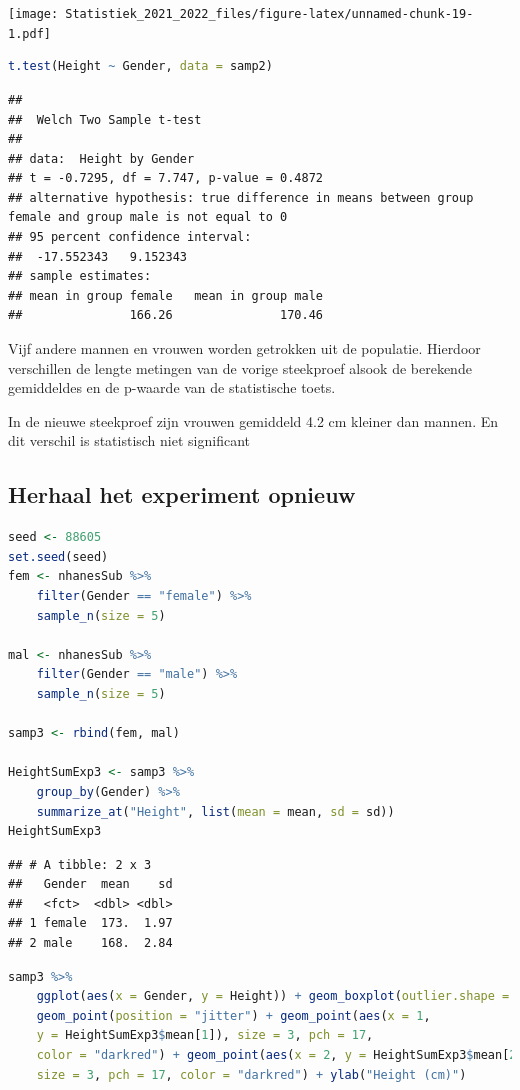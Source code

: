 \documentclass[
  12pt,dutch,coursenotes]{book}
\theoremstyle{definition}
\theoremstyle{definition}
\theoremstyle{definition}
\theoremstyle{definition}
\theoremstyle{remark}
\begin{document}
\texttt{[image: Statistiek\_2021\_2022\_files/figure-latex/unnamed-chunk-19-1.pdf]}

\begin{lstlisting}[language=R]
t.test(Height ~ Gender, data = samp2)
\end{lstlisting}

\begin{lstlisting}
## 
##  Welch Two Sample t-test
## 
## data:  Height by Gender
## t = -0.7295, df = 7.747, p-value = 0.4872
## alternative hypothesis: true difference in means between group female and group male is not equal to 0
## 95 percent confidence interval:
##  -17.552343   9.152343
## sample estimates:
## mean in group female   mean in group male 
##               166.26               170.46
\end{lstlisting}

Vijf andere mannen en vrouwen worden getrokken uit de populatie. Hierdoor verschillen de lengte metingen van de vorige steekproef alsook de berekende gemiddeldes en de p-waarde van de statistische toets.

In de nieuwe steekproef zijn vrouwen gemiddeld 4.2 cm kleiner dan mannen. En dit verschil is statistisch niet significant

\hypertarget{herhaal-het-experiment-opnieuw}{%
\subsection{Herhaal het experiment opnieuw}\label{herhaal-het-experiment-opnieuw}}

\begin{lstlisting}[language=R]
seed <- 88605
set.seed(seed)
fem <- nhanesSub %>%
    filter(Gender == "female") %>%
    sample_n(size = 5)

mal <- nhanesSub %>%
    filter(Gender == "male") %>%
    sample_n(size = 5)

samp3 <- rbind(fem, mal)

HeightSumExp3 <- samp3 %>%
    group_by(Gender) %>%
    summarize_at("Height", list(mean = mean, sd = sd))
HeightSumExp3
\end{lstlisting}

\begin{lstlisting}
## # A tibble: 2 x 3
##   Gender  mean    sd
##   <fct>  <dbl> <dbl>
## 1 female  173.  1.97
## 2 male    168.  2.84
\end{lstlisting}

\begin{lstlisting}[language=R]
samp3 %>%
    ggplot(aes(x = Gender, y = Height)) + geom_boxplot(outlier.shape = NA) +
    geom_point(position = "jitter") + geom_point(aes(x = 1,
    y = HeightSumExp3$mean[1]), size = 3, pch = 17,
    color = "darkred") + geom_point(aes(x = 2, y = HeightSumExp3$mean[2]),
    size = 3, pch = 17, color = "darkred") + ylab("Height (cm)")
\end{lstlisting}
\end{document}
